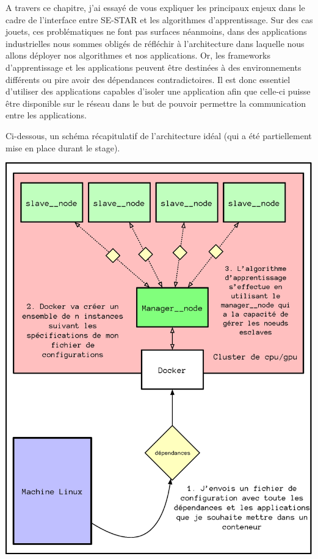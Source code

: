 A travers ce chapitre, j'ai essayé de vous expliquer les principaux enjeux dans le cadre de l'interface entre SE-STAR et les algorithmes d'apprentissage. Sur des cas jouets, ces problématiques ne font pas surfaces néanmoins, dans des applications industrielles nous sommes obligés de réfléchir à l'architecture dans laquelle nous allons déployer nos algorithmes et nos applications. Or, les \gls{frameworks} d'apprentissage et les applications peuvent être destinées à des environnements différents ou pire avoir des dépendances contradictoires. Il est donc essentiel  d'utiliser des applications capables d'isoler une application afin que celle-ci puisse être  disponible sur le réseau dans le but de pouvoir permettre la communication entre les applications.

Ci-dessous, un schéma récapitulatif de l'architecture idéal (qui a été partiellement mise en place durant le stage).


\begin{center}
\includegraphics[scale=.7]{./assets/interfaceReseau/interfaceResume.eps}
\end{center}
